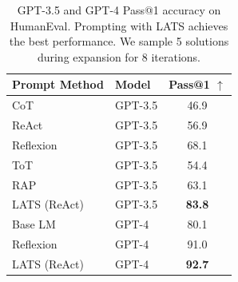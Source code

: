 \begin{table}[t]
    \centering
    \begin{tabular}{ll | c}
    \toprule
    \textbf{Prompt Method} & \textbf{Model} & \textbf{Pass@1 $\uparrow$} \\
    \midrule
    CoT {\scriptsize~\citep{wei2022chain}} & GPT-3.5 & 46.9 \\
    ReAct {\scriptsize~\citep{yao2023react}} & GPT-3.5 & 56.9 \\
    Reflexion {\scriptsize~\citep{shinn2023reflexion}} & GPT-3.5 & 68.1 \\
    ToT {\scriptsize~\citep{yao2023tree}} & GPT-3.5 & 54.4 \\
    RAP {\scriptsize~\citep{hao2023reasoning}} & GPT-3.5 & 63.1 \\
    LATS (ReAct) & GPT-3.5 & \textbf{83.8} \\ 
    \midrule
    Base LM & GPT-4 & 80.1 \\
    Reflexion & GPT-4 & 91.0 \\
    LATS (ReAct) & GPT-4 & \textbf{92.7} \\
    \bottomrule
    \end{tabular}
    \caption{GPT-3.5 and GPT-4 Pass@1 accuracy on HumanEval. Prompting with LATS achieves the best performance. We sample 5 solutions during expansion for 8 iterations.}
    \label{tab:humaneval}
\end{table}